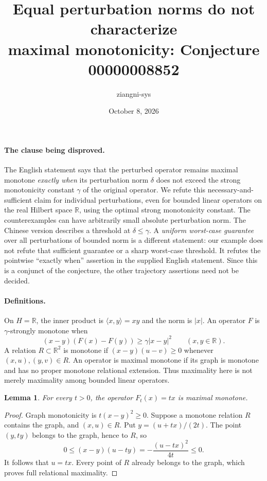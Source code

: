 \documentclass[11pt]{article}
\title{Equal perturbation norms do not characterize\\maximal monotonicity: Conjecture 00000008852}
\author{ziangni-sys}
\date{October 8, 2026}
\newtheorem{lemma}{Lemma}
\begin{document}
\maketitle

\paragraph{The clause being disproved.}
The English statement says that the perturbed operator remains maximal
monotone \emph{exactly when} its perturbation norm $\delta$ does not exceed
the strong monotonicity constant $\gamma$ of the original operator.
We refute this necessary-and-sufficient claim for individual perturbations,
even for bounded linear operators on the real Hilbert space $\mathbb R$,
using the optimal strong monotonicity constant. The counterexamples can
have arbitrarily small absolute perturbation norm.
The Chinese version describes a threshold at $\delta\leq\gamma$.
A \emph{uniform worst-case guarantee} over all perturbations of bounded norm
is a different statement: our example does not refute that sufficient
guarantee or a sharp worst-case threshold. It refutes the pointwise
``exactly when'' assertion in the supplied English statement.
Since this is a conjunct of the conjecture, the other trajectory assertions
need not be decided.

\paragraph{Definitions.}
On $H=\mathbb R$, the inner product is $\langle x,y\rangle=xy$ and the norm is
$|x|$. An operator $F$ is $\gamma$-strongly monotone when
\[
 (x-y)(F(x)-F(y))\geq\gamma |x-y|^2 \qquad(x,y\in\mathbb R).
\]
A relation $R\subset\mathbb R^2$ is monotone if
$(x-y)(u-v)\geq0$ whenever $(x,u),(y,v)\in R$.
An operator is maximal monotone if its graph is monotone and has no proper
monotone relational extension. Thus maximality here is not merely maximality
among bounded linear operators.

\begin{lemma}
For every $t>0$, the operator $F_t(x)=tx$ is maximal monotone.
\end{lemma}
\begin{proof}
Graph monotonicity is $t(x-y)^2\geq0$. Suppose a monotone relation $R$
contains the graph, and $(x,u)\in R$. Put $y=(u+tx)/(2t)$.
The point $(y,ty)$ belongs to the graph, hence to $R$, so
\[
 0\leq(x-y)(u-ty)=-\frac{(u-tx)^2}{4t}\leq0.
\]
It follows that $u=tx$. Every point of $R$ already belongs to the graph,
which proves full relational maximality.
\end{proof}
\end{document}
